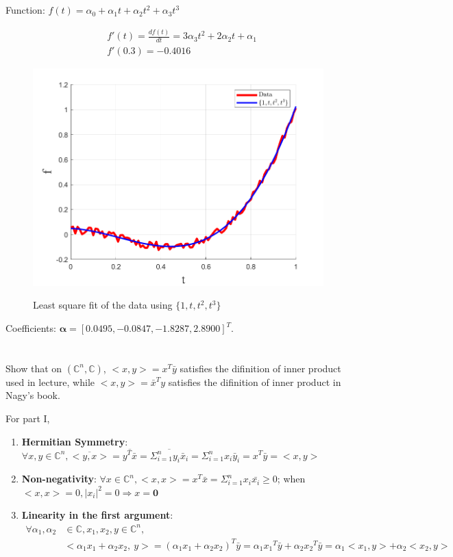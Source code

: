 \documentclass{article}
\theoremstyle{definition} %
\newcommand{\CC}{\mathbb{C}}
\begin{document}
\section{}

Function: $f(t) = \alpha_0 + \alpha_1 t + \alpha_2 t^2 + \alpha_3 t^3$

\begin{align*}
	&f'(t) = \frac{df(t)}{dt} = 3\alpha_3 t^2 + 2 \alpha_2 t + \alpha_1\\
	&f'(0.3) = -0.4016	
\end{align*}

\begin{figure}[H]
    \centering
        \textsf{\includegraphics[width=0.6\columnwidth]{hw5-prob5-fig1.png}}
        \caption{Least square fit of the data using $\{1, t, t^2, t^3\}$}
        \label{fig: 5-1}
\end{figure}

Coefficients: $\boldsymbol \alpha =[
    0.0495,
   -0.0847,
   -1.8287,
    2.8900]^T.
$

\section{}
Show that on $(\CC^n, \CC)$, $<x, y> = x^T\bar{y}$ satisfies the difinition of inner product used in lecture, while $<x, y> = \bar{x}^T y$ satisfies the difinition of inner product in Nagy's book.

For part I, 

\begin{enumerate}[label=(\alph*)]
	\item \textbf{Hermitian Symmetry}: $\forall x, y\in \CC^n, \overline{<y, x>} = \overline{y^T\bar{x}} = \overline{\Sigma_{i=1}^ny_i\bar x_i} = \Sigma_{i=1}^nx_i\bar y_i = x^T\bar{y} = <x, y>$
	\item \textbf{Non-negativity}: $\forall x\in \CC^n, <x,x> = x^T\bar{x} = \Sigma_{i=1}^nx_i\bar{x_i} \ge 0$; when $<x,x>=0, |x_i|^2 = 0 \Rightarrow x=\mathbf 0$
	\item \textbf{Linearity in the first argument}:
	\begin{align*}
		\forall \alpha_1, \alpha_2& \in \CC, x_1, x_2, y \in \CC^n,\\
		&<\alpha_1 x_1 + \alpha_2 x_2,\ y> = (\alpha_1 x_1 + \alpha_2 x_2)^T\bar{y} = {\alpha_1 x_1}^T\bar{y} + {\alpha_2 x_2}^T\bar{y} = \alpha_1 <x_1, y> + \alpha_2 <x_2, y>
	\end{align*}
\end{enumerate}
\end{document}
